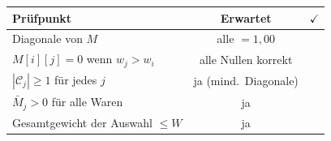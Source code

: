 \documentclass[a4paper,11pt]{article}
\begin{document}
\begin{appendices}
\begin{center}
\small
\begin{tabular}{lcc}
\toprule
Prüfpunkt & Erwartet & $\checkmark$ \\
\midrule
Diagonale von $M$ & alle $= 1{,}00$ & \\
$M[i][j] = 0$ wenn $w_j > w_i$ & alle Nullen korrekt & \\
$|\mathcal{C}_j| \ge 1$ für jedes $j$ & ja (mind.\ Diagonale) & \\
$\bar{M}_j > 0$ für alle Waren & ja & \\
Gesamtgewicht der Auswahl $\le W$ & ja & \\
\bottomrule
\end{tabular}
\end{center}

\end{appendices}
\end{document}
